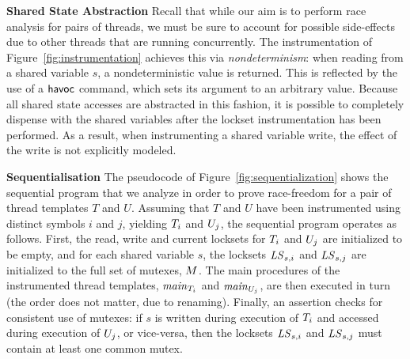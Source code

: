 \medskip\noindent\textbf{Shared State Abstraction }
%
Recall that while our aim is to perform race analysis for pairs of threads, we must be sure to account for possible side-effects due to other threads that are running concurrently.  The instrumentation of Figure~\ref{fig:instrumentation} achieves this via \emph{nondeterminism}: when reading from a shared variable $s$, a nondeterministic value is returned.  This is reflected by the use of a $\mathsf{havoc}$ command, which sets its argument to an arbitrary value.  Because all shared state accesses are abstracted in this fashion, it is possible to completely dispense with the shared variables after the lockset instrumentation has been performed.  As a result, when instrumenting a shared variable write, the effect of the write is not explicitly modeled.

\medskip\noindent\textbf{Sequentialisation }
%
The pseudocode of Figure~\ref{fig:sequentialization} shows the sequential program that we analyze in order to prove race-freedom for a pair of thread templates $T$ and $U$. Assuming that $T$ and $U$ have been instrumented using distinct symbols $i$ and $j$, yielding $T_{i}$ and $U_{j}$, the sequential program operates as follows. First, the read, write and current locksets for $T_{i}$ and $U_{j}$ are initialized to be empty, and for each shared variable $s$, the locksets $\mathit{LS}_{s,i}$ and $\mathit{LS}_{s,j}$ are initialized to the full set of mutexes, $M$.  The main procedures of the instrumented thread templates, $\mathit{main}_{T_{i}}$ and $\mathit{main}_{U_{j}}$, are then executed in turn (the order does not matter, due to renaming). Finally, an assertion checks for consistent use of mutexes: if $s$ is written during execution of $T_{i}$ and accessed during execution of $U_{j}$, or vice-versa, then the locksets $\mathit{LS}_{s,i}$ and $\mathit{LS}_{s,j}$ must contain at least one common mutex.

